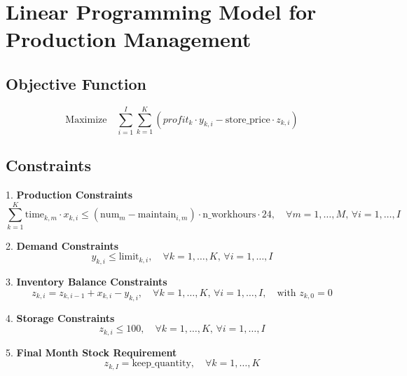 \documentclass{article}
\begin{document}
\section*{Linear Programming Model for Production Management}

\subsection*{Objective Function}
\[
\text{Maximize} \quad \sum_{i=1}^{I} \sum_{k=1}^{K} \left( profit_k \cdot y_{k,i} - \text{store\_price} \cdot z_{k,i} \right)
\]

\subsection*{Constraints}

1. \textbf{Production Constraints}
\[
\sum_{k=1}^{K} \text{time}_{k,m} \cdot x_{k,i} \leq \left(\text{num}_{m} - \text{maintain}_{i,m}\right) \cdot \text{n\_workhours} \cdot 24, \quad \forall m = 1, \ldots, M, \, \forall i = 1, \ldots, I
\]

2. \textbf{Demand Constraints}
\[
y_{k,i} \leq \text{limit}_{k,i}, \quad \forall k = 1, \ldots, K, \, \forall i = 1, \ldots, I
\]

3. \textbf{Inventory Balance Constraints}
\[
z_{k,i} = z_{k,i-1} + x_{k,i} - y_{k,i}, \quad \forall k = 1, \ldots, K, \, \forall i = 1, \ldots, I, \quad \text{with } z_{k,0} = 0
\]

4. \textbf{Storage Constraints}
\[
z_{k,i} \leq 100, \quad \forall k = 1, \ldots, K, \, \forall i = 1, \ldots, I
\]

5. \textbf{Final Month Stock Requirement}
\[
z_{k,I} = \text{keep\_quantity}, \quad \forall k = 1, \ldots, K
\]
\end{document}
